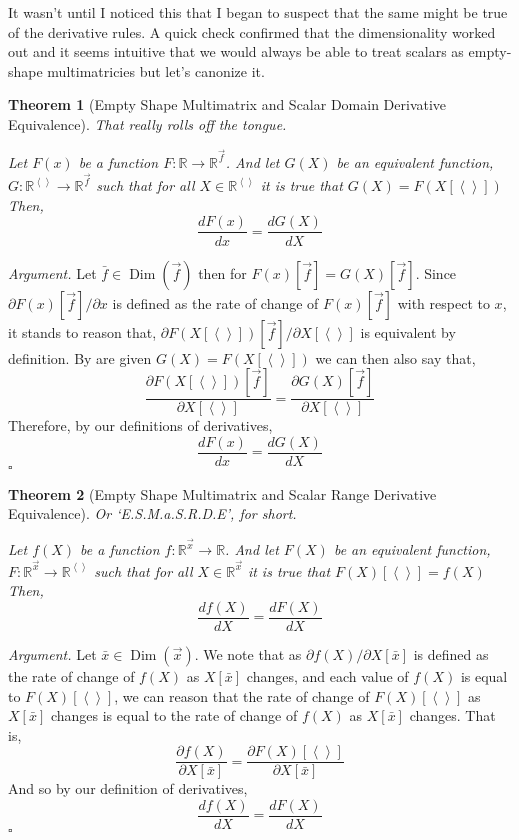 \documentclass[12pt]{book}
\theoremstyle{plain}
\newtheorem{theorem}{Theorem}[chapter]
\theoremstyle{definition}
\theoremstyle{ppart}
\theoremstyle{case}
\theoremstyle{solution}
\newenvironment{argument}{\noindent\textit{Argument.}}{\hfill$\square$}
\DeclareMathOperator{\Dim}{Dim}
\begin{document}
It wasn't until I noticed this that I began to suspect that the same might be true
of the derivative rules.
A quick check confirmed that the dimensionality worked out and it seems intuitive
that we would always be able to treat scalars
as empty-shape multimatricies but let's canonize it.

\begin{theorem}[Empty Shape Multimatrix and Scalar Domain Derivative Equivalence]
\label{s_mm_domain_equiv}
That really rolls off the tongue.

Let $F(x)$ be a function $F : \mathbb{R} \to \mathbb{R}^{\vec{f}}$. And let
$G(X)$ be an equivalent function,
$G : \mathbb{R}^{\left<\right>} \to \mathbb{R}^{\vec{f}}$
such that for all $X \in \mathbb{R}^{\left<\right>}$ it is true that
$G(X) = F(X[\left<\right>])$
Then,
\[ \frac{dF(x)}{dx} = \frac{dG(X)}{dX} \]
\end{theorem}
\begin{argument}
Let $\bar{f} \in \Dim(\vec{f})$ then for $F(x)[\vec{f}] = G(X)[\vec{f}]$.
Since $\partial F(x)[\vec{f}] / \partial x$ is defined as the rate of
change of $F(x)[\vec{f}]$ with respect to $x$, it stands to reason that,
$\partial F(X[\left<\right>])[\vec{f}] / \partial X[\left<\right>]$ is
equivalent by definition. By are given $G(X) = F(X[\left<\right>])$ we
can then also say that,
\[
\frac{ \partial F(X[\left<\right>])[\vec{f}] }{ \partial X[\left<\right>] }
=
\frac{ \partial G(X)[\vec{f}] }{ \partial X[\left<\right>] }
\]
Therefore, by our definitions of derivatives,
\[
\frac{ d F(x) }{ d x }
=
\frac{ d G(X) }{ d X }
\]
\end{argument}

\begin{theorem}[Empty Shape Multimatrix and Scalar Range Derivative Equivalence]
\label{s_mm_range_equiv} Or `E.S.M.a.S.R.D.E', for short.

Let $f(X)$ be a function $f : \mathbb{R}^{\vec{x}} \to \mathbb{R}$. And let
$F(X)$ be an equivalent function,
$F : \mathbb{R}^{\vec{x}} \to \mathbb{R}^{\left<\right>}$
such that for all $X \in \mathbb{R}^{\vec{x}}$ it is true that
$F(X)[\left<\right>] = f(X)$
Then,
\[ \frac{df(X)}{dX} = \frac{dF(X)}{dX} \]
\end{theorem}
\begin{argument}
Let $\bar{x} \in \Dim(\vec{x})$. We note that as $\partial f(X) / \partial X[\bar{x}]$
is defined as the rate of change of $f(X)$ as $X[\bar{x}]$ changes, and each value of
$f(X)$ is equal to $F(X)[\left<\right>]$, we can reason that the rate of change of
$F(X)[\left<\right>]$ as $X[\bar{x}]$ changes is equal to the rate of change of $f(X)$
as $X[\bar{x}]$ changes. That is,
\[
	\frac{\partial f(X)}{\partial X[\bar{x}]}
		=
	\frac{\partial F(X)[\left<\right>]}{\partial X[\bar{x}]}
\]
And so by our definition of derivatives,
\[ \frac{df(X)}{dX} = \frac{dF(X)}{dX} \]
\end{argument}
\end{document}
